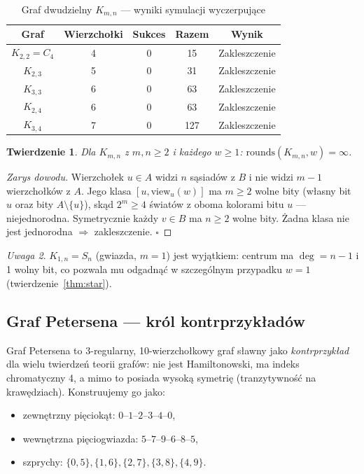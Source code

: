 \documentclass[12pt,a4paper]{article}
\theoremstyle{plain}
\newtheorem{theorem}{Twierdzenie}[section]
\theoremstyle{definition}
\theoremstyle{remark}
\newtheorem{remark}[theorem]{Uwaga}
\newcommand{\rounds}{\mathrm{rounds}}
\newcommand{\view}{\mathrm{view}}
\begin{document}
\begin{table}[H]
\centering
\caption{Graf dwudzielny $K_{m,n}$ — wyniki symulacji wyczerpujące}
\begin{tabular}{ccccc}
\toprule
Graf & Wierzchołki & Sukces & Razem & Wynik \\
\midrule
$K_{2,2} = C_4$ & 4 & 0 & 15  & Zakleszczenie \\
$K_{2,3}$       & 5 & 0 & 31  & Zakleszczenie \\
$K_{3,3}$       & 6 & 0 & 63  & Zakleszczenie \\
$K_{2,4}$       & 6 & 0 & 63  & Zakleszczenie \\
$K_{3,4}$       & 7 & 0 & 127 & Zakleszczenie \\
\bottomrule
\end{tabular}
\end{table}

\begin{theorem}
\label{thm:bipartite}
Dla $K_{m,n}$ z $m,n \ge 2$ i każdego $w \ge 1$: $\rounds(K_{m,n}, w) = \infty$.
\end{theorem}

\begin{proof}[Zarys dowodu]
Wierzchołek $u \in A$ widzi $n$ sąsiadów z $B$ i nie widzi $m-1$ wierzchołków z $A$. Jego klasa $[u, \view_u(w)]$ ma $m \ge 2$ wolne bity (własny bit $u$ oraz bity $A \setminus \{u\}$), skąd $2^m \ge 4$ światów z oboma kolorami bitu $u$ — niejednorodna. Symetrycznie każdy $v \in B$ ma $n \ge 2$ wolne bity. Żadna klasa nie jest jednorodna $\Rightarrow$ zakleszczenie. $\square$
\end{proof}

\begin{remark}
$K_{1,n} = S_n$ (gwiazda, $m=1$) jest wyjątkiem: centrum ma $\deg = n-1$ i 1 wolny bit, co pozwala mu odgadnąć w szczególnym przypadku $w=1$ (twierdzenie~\ref{thm:star}).
\end{remark}

\subsection{Graf Petersena — król kontrprzykładów}
\label{sec:petersen}

Graf Petersena to 3-regularny, 10-wierzchołkowy graf sławny jako \emph{kontrprzykład} dla wielu twierdzeń teorii grafów: nie jest Hamiltonowski, ma indeks chromatyczny 4, a mimo to posiada wysoką symetrię (tranzytywność na krawędziach). Konstruujemy go jako:
\begin{itemize}
  \item zewnętrzny pięciokąt: $0$--$1$--$2$--$3$--$4$--$0$,
  \item wewnętrzna pięciogwiazda: $5$--$7$--$9$--$6$--$8$--$5$,
  \item szprychy: $\{0,5\},\{1,6\},\{2,7\},\{3,8\},\{4,9\}$.
\end{itemize}
\end{document}
